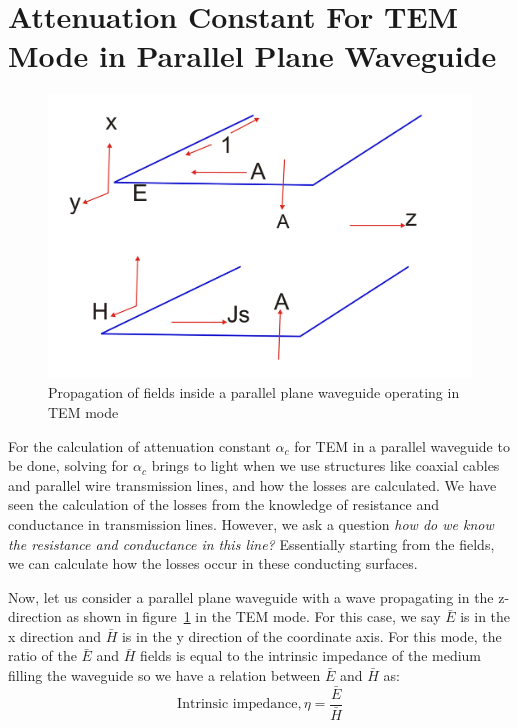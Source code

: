 \section{Attenuation Constant For TEM Mode in Parallel Plane Waveguide}
\begin{figure}[h]
\centering
\includegraphics[scale=0.45]{./graphics/lecture2-image-b.png}
\caption{Propagation of fields inside a parallel plane waveguide operating in TEM mode}
\label{fig:elcture2imageb}
\end{figure}

For the calculation of attenuation constant $\alpha_c$  for TEM in a parallel waveguide to be done, solving for $\alpha_c$ brings to light when we use structures like coaxial cables and parallel wire transmission lines, and how the losses are calculated. We have seen the calculation of the losses from the knowledge of resistance and conductance in transmission lines. However, we ask a question \emph{how do we know the resistance and conductance in this line?} Essentially starting from the fields, we can calculate how the losses occur in these conducting surfaces.

Now, let us consider a parallel plane waveguide with a wave propagating in the z-direction as shown in figure~\ref{fig:elcture2imageb} in the TEM mode. For this case, we say $\bar{E}$ is in the x direction and $\bar{H}$ is in the y direction of the coordinate axis. For this mode, the ratio of the $\bar{E}$ and $\bar{H}$ fields is equal to the intrinsic impedance of the medium filling the waveguide so we have a relation between $\bar{E}$ and $\bar{H}$ as:
\begin{dmath*}
\text{Intrinsic impedance}, \eta = \frac{\bar{E}}{\bar{H}}
\end{dmath*}

